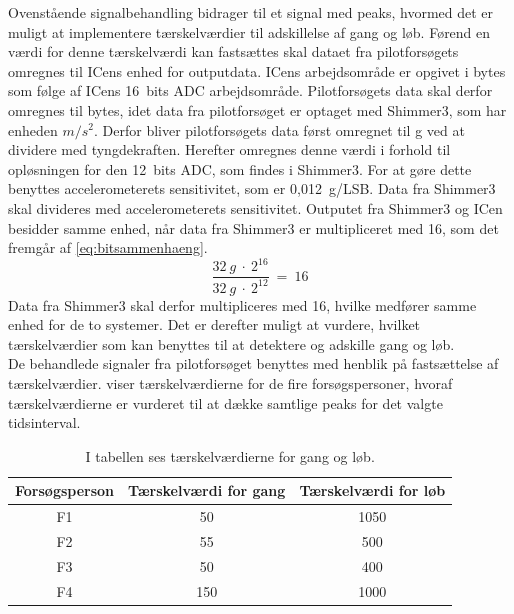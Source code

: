 Ovenstående signalbehandling bidrager til et signal med peaks, hvormed det er muligt at implementere tærskelværdier til adskillelse af gang og løb. Førend en værdi for denne tærskelværdi kan fastsættes skal dataet fra pilotforsøgets omregnes til ICens enhed for outputdata. ICens arbejdsområde er opgivet i bytes som følge af ICens 16~bits ADC arbejdsområde. Pilotforsøgets data skal derfor omregnes til bytes, idet data fra pilotforsøget er optaget med Shimmer3, som har enheden $m/s^{2}$. Derfor bliver pilotforsøgets data først omregnet til g ved at dividere med tyngdekraften. Herefter omregnes denne værdi i forhold til opløsningen for den 12~bits ADC, som findes i Shimmer3. For at gøre dette benyttes accelerometerets sensitivitet, som er 0,012~g/LSB. Data fra Shimmer3 skal divideres med accelerometerets sensitivitet. Outputet fra Shimmer3 og ICen besidder samme enhed, når data fra Shimmer3 er multipliceret med 16, som det fremgår af \eqref{eq:bitsammenhaeng}.
\begin{equation}
\frac{32~g~\cdot~2^{16}}{32~g~\cdot~2^{12}}~=~16
\label{eq:bitsammenhaeng}
\end{equation}
Data fra Shimmer3 skal derfor multipliceres med 16, hvilke medfører samme enhed for de to systemer. Det er derefter muligt at vurdere, hvilket tærskelværdier som kan benyttes til at detektere og adskille gang og løb.\\
De behandlede signaler fra pilotforsøget benyttes med henblik på fastsættelse af tærskelværdier.  viser tærskelværdierne for de fire forsøgspersoner, hvoraf tærskelværdierne er vurderet til at dække samtlige peaks for det valgte tidsinterval. 
\begin{table}[H]
	\centering
	\begin{tabular}{ccc}
		\hline
		\rowcolor[HTML]{C0C0C0} 
		Forsøgsperson & Tærskelværdi for gang & Tærskelværdi for løb \\ \hline
		\rowcolor[HTML]{FFFFFF} 
		F1 & 50 & 1050 \\ \hline
		\rowcolor[HTML]{FFFFFF} 
		F2 & 55 & 500 \\ \hline
		\rowcolor[HTML]{FFFFFF} 
		F3 & 50 & 400 \\ \hline
		\rowcolor[HTML]{FFFFFF} 
		F4 & 150 & 1000 \\ \hline
	\end{tabular}
	\caption{I tabellen ses tærskelværdierne for gang og løb.}
	\label{tab:individuel_taerskel}
\end{table}\vspace{-0.50cm}
